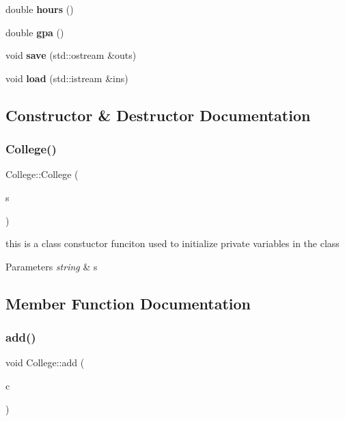 \begin{DoxyCompactItemize}
double {\bfseries hours} ()
\item 
\mbox{\label{class_college_aaf9bfaa0bc717e96da6365661a96fcd0}} 
double {\bfseries gpa} ()
\item 
\mbox{\label{class_college_af6b419f813bc990c0e11f99b78a26899}} 
void {\bfseries save} (std\+::ostream \&outs)
\item 
\mbox{\label{class_college_a11422094ddd907705daede7aa537dd73}} 
void {\bfseries load} (std\+::istream \&ins)
\end{DoxyCompactItemize}


\subsection{Constructor \& Destructor Documentation}
\mbox{\label{class_college_adabaf4087355e83f9f7d39f1e1498b41}} 
\subsubsection{\texorpdfstring{College()}{College()}}
{\footnotesize\ttfamily College\+::\+College (\begin{DoxyParamCaption}\item[{std\+::string}]{s }\end{DoxyParamCaption})}



this is a class constuctor funciton used to initialize private variables in the class 


\begin{DoxyParams}{Parameters}
{\em string} & s \\
\hline
\end{DoxyParams}


\subsection{Member Function Documentation}
\mbox{\label{class_college_a67fd1d8970b46b24ce2e0dd72598a22f}} 
\subsubsection{\texorpdfstring{add()}{add()}}
{\footnotesize\ttfamily void College\+::add (\begin{DoxyParamCaption}\item[{\hyperlink{classcourse}{course} \&}]{c }\end{DoxyParamCaption})}



